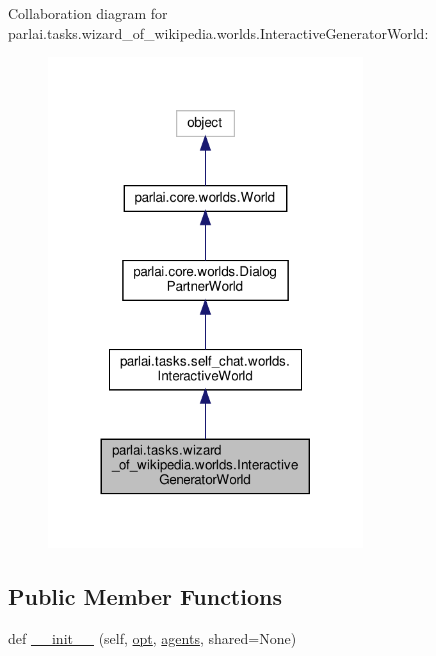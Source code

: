 Collaboration diagram for parlai.\+tasks.\+wizard\+\_\+of\+\_\+wikipedia.\+worlds.\+Interactive\+Generator\+World\+:
\nopagebreak
\begin{figure}[H]
\begin{center}
\leavevmode
\includegraphics[width=236pt]{d5/d32/classparlai_1_1tasks_1_1wizard__of__wikipedia_1_1worlds_1_1InteractiveGeneratorWorld__coll__graph}
\end{center}
\end{figure}
\subsection*{Public Member Functions}
\begin{DoxyCompactItemize}
\item 
def \hyperlink{classparlai_1_1tasks_1_1wizard__of__wikipedia_1_1worlds_1_1InteractiveGeneratorWorld_aa0a062edf765935670b849cae9b6d5fc}{\+\_\+\+\_\+init\+\_\+\+\_\+} (self, \hyperlink{classparlai_1_1tasks_1_1wizard__of__wikipedia_1_1worlds_1_1InteractiveGeneratorWorld_aef25f6c11236d9465445b81dff86c31f}{opt}, \hyperlink{classparlai_1_1core_1_1worlds_1_1DialogPartnerWorld_a04185d1d55ca86c96c796f12f2226fc9}{agents}, shared=None)
\end{DoxyCompactItemize}
